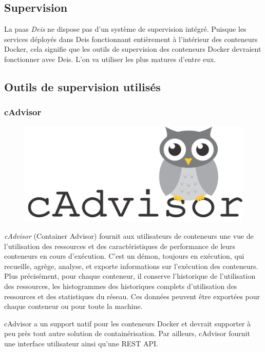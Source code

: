 \begin{onehalfspace}
\section{Supervision}

La \acrshort{paas} \emph{Deis} ne dispose pas d'un système de supervision intégré. Puisque les services déployés dans Deis fonctionnant entièrement à l'intérieur des conteneurs Docker, cela signifie que les outils de supervision des conteneurs Docker devraient fonctionner avec Deis. L'on va utiliser les plus matures d'entre eux.


\subsection{Outils de supervision utilisés}

	
\subsubsection*{cAdvisor}



\begin{figure}
\centering
\includegraphics[scale=0.2]{chapitre5/assets/cadvisor}
\end{figure}
\noindent \emph{cAdvisor} (Container Advisor) fournit aux utilisateurs de conteneurs une vue de l'utilisation des ressources et des caractéristiques de performance de leurs conteneurs en cours d'exécution. C'est un démon, toujours en exécution, qui recueille, agrège, analyse, et exporte informations sur l'exécution des conteneurs. Plus précisément, pour chaque conteneur, il conserve l'historique de l'utilisation des ressources, les histogrammes des historiques complets d'utilisation des ressources et des statistiques du réseau. Ces données peuvent être exportées pour chaque conteneur ou pour toute la machine.

cAdvisor a un support natif pour les conteneurs Docker et devrait supporter à peu près tout autre solution de containérisation. Par ailleurs, cAdvisor fournit une interface utilisateur ainsi qu'une REST API.



\end{onehalfspace}
